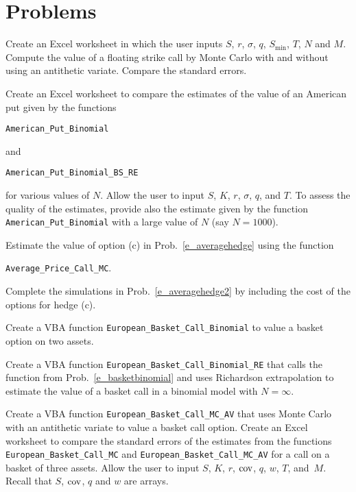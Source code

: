 \section*{Problems}

\begin{prob} Create an Excel worksheet in which the user inputs $S$, $r$, $\sigma$, $q$, $S_{\text{min}}$, $T$, $N$ and $M$.  Compute the value of a floating strike call by Monte Carlo with and without using an antithetic variate.  Compare the standard errors.
\end{prob}
\begin{prob} Create an Excel worksheet to compare the estimates of the value of an American put given by the functions 
\begin{center}\small
\verb!American_Put_Binomial!
\end{center}\normalsize
and 
\begin{center}\small
\verb!American_Put_Binomial_BS_RE!
\end{center}\normalsize
for various values of $N$.  Allow the user to input $S$, $K$, $r$, $\sigma$, $q$, and $T$.  To assess the quality of the estimates, provide also the estimate given by the function \verb!American_Put_Binomial! with a large value of $N$ (say $N = 1000$).  \label{e_richextrap}\end{prob}
\begin{prob} Estimate the value of option (c) in Prob.~\ref{e_averagehedge} using the function 
\begin{center}\small
\verb!Average_Price_Call_MC!.
\end{center}\normalsize
Complete the simulations in Prob.~\ref{e_averagehedge2} by including the cost of the options for hedge (c).\end{prob}
\begin{prob} \label{e_basketbinomial} Create a VBA function \verb!European_Basket_Call_Binomial! to value a basket option on two assets. \end{prob}
\begin{prob} Create a VBA function \verb!European_Basket_Call_Binomial_RE! that calls the function from Prob.~\ref{e_basketbinomial} and uses Richardson extrapolation to estimate the value of a basket call in a binomial model with $N=\infty$.  \end{prob}
\begin{prob} Create a VBA function \verb!European_Basket_Call_MC_AV! that uses Monte Carlo with an antithetic variate to value a basket call option. Create an Excel worksheet to compare the standard errors of the estimates from the functions \verb!European_Basket_Call_MC! and \verb!European_Basket_Call_MC_AV! for a call on a basket of three assets.  Allow the user to input $S$, $K$, $r$, $\operatorname{cov}$, $q$, $w$, $T$, and~$M$.  Recall that $S$, $\operatorname{cov}$, $q$ and $w$ are arrays.
\end{prob}
